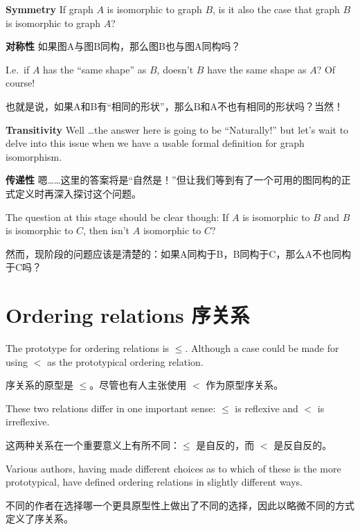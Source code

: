 {\bf Symmetry}  If graph $A$ is isomorphic to graph $B$, is it also the case that graph $B$
is isomorphic to graph $A$?

{\bf 对称性} 如果图A与图B同构，那么图B也与图A同构吗？

I.e.\ if $A$ has the ``same shape'' as $B$, doesn't $B$ have the
same shape as $A$?  Of course!

也就是说，如果A和B有“相同的形状”，那么B和A不也有相同的形状吗？当然！

{\bf Transitivity}  Well \ldots the answer here is going to be ``Naturally!'' but let's wait
to delve into this issue when we have a usable formal definition for graph isomorphism.

{\bf 传递性} 嗯……这里的答案将是“自然是！”但让我们等到有了一个可用的图同构的正式定义时再深入探讨这个问题。

The
question at this stage should be clear though: If $A$ is isomorphic to $B$ and $B$ is isomorphic 
to $C$, then isn't $A$ isomorphic to $C$?

然而，现阶段的问题应该是清楚的：如果A同构于B，B同构于C，那么A不也同构于C吗？

\newpage






\newpage

\section{Ordering relations 序关系}
\label{sec:ord_rel}

The prototype for ordering relations is $\leq$.  Although a case
could be made for using $<$ as the prototypical ordering relation.

序关系的原型是 $\leq$。尽管也有人主张使用 $<$ 作为原型序关系。

These two relations differ in one important sense: $\leq$ is reflexive
and $<$ is irreflexive.

这两种关系在一个重要意义上有所不同：$\leq$ 是自反的，而 $<$ 是反自反的。

Various authors, having made different 
choices as to which of these is the more prototypical, have
defined ordering relations in slightly different ways.

不同的作者在选择哪一个更具原型性上做出了不同的选择，因此以略微不同的方式定义了序关系。

